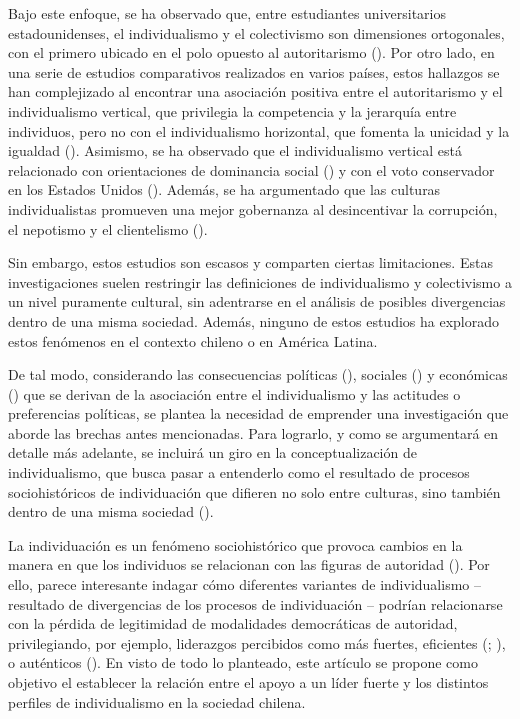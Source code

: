 \documentclass[
  letterpaper,
  DIV=11,
  numbers=noendperiod]{scrartcl}
\begin{document}
Bajo este enfoque, se ha observado que, entre estudiantes universitarios
estadounidenses, el individualismo y el colectivismo son dimensiones
ortogonales, con el primero ubicado en el polo opuesto al autoritarismo
(). Por otro
lado, en una serie de estudios comparativos realizados en varios países,
estos hallazgos se han complejizado al encontrar una asociación positiva
entre el autoritarismo y el individualismo vertical, que privilegia la
competencia y la jerarquía entre individuos, pero no con el
individualismo horizontal, que fomenta la unicidad y la igualdad
(). Asimismo, se
ha observado que el individualismo vertical está relacionado con
orientaciones de dominancia social () y con el voto conservador en los Estados Unidos
(). Además, se ha
argumentado que las culturas individualistas promueven una mejor
gobernanza al desincentivar la corrupción, el nepotismo y el
clientelismo ().

Sin embargo, estos estudios son escasos y comparten ciertas
limitaciones. Estas investigaciones suelen restringir las definiciones
de individualismo y colectivismo a un nivel puramente cultural, sin
adentrarse en el análisis de posibles divergencias dentro de una misma
sociedad. Además, ninguno de estos estudios ha explorado estos fenómenos
en el contexto chileno o en América Latina.

De tal modo, considerando las consecuencias políticas
(), sociales
() y económicas
() que se derivan de la
asociación entre el individualismo y las actitudes o preferencias
políticas, se plantea la necesidad de emprender una investigación que
aborde las brechas antes mencionadas. Para lograrlo, y como se
argumentará en detalle más adelante, se incluirá un giro en la
conceptualización de individualismo, que busca pasar a entenderlo como
el resultado de procesos sociohistóricos de individuación que difieren
no solo entre culturas, sino también dentro de una misma sociedad
().

La individuación es un fenómeno sociohistórico que provoca cambios en la
manera en que los individuos se relacionan con las figuras de autoridad
(). Por ello, parece interesante
indagar cómo diferentes variantes de individualismo -- resultado de
divergencias de los procesos de individuación -- podrían relacionarse
con la pérdida de legitimidad de modalidades democráticas de autoridad,
privilegiando, por ejemplo, liderazgos percibidos como más fuertes,
eficientes (;
), o auténticos
(). En visto de todo lo
planteado, este artículo se propone como objetivo el establecer la
relación entre el apoyo a un líder fuerte y los distintos perfiles de
individualismo en la sociedad chilena.
\end{document}
